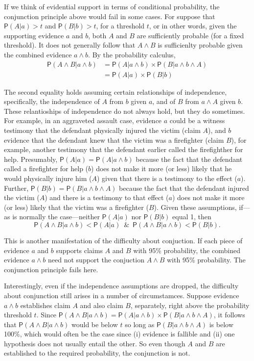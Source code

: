 \documentclass[10pt,dvipsnames,enabledeprecatedfontcommands]{scrartcl}
\newcommand{\et}{\wedge}
\newcommand{\pr}[1]{\mathsf{P}(#1)}
\begin{document}
If we think of evidential support in terms of conditional probability,
the conjunction principle above would fail in some cases. For suppose
that \(\pr{A | a}>t\) and \(\pr{B | b}>t\), for a threshold \(t\), or in
other words, given the supporting evidence \(a\) and \(b\), both \(A\)
and \(B\) are sufficiently probable (for a fixed threshold). It does not
generally follow that \(A \et B\) is sufficienlty probable given the
combined evidence \(a\et b\). By the probability calculus,
\begin{align*}
\pr{A \wedge  B | a \wedge b}& =\pr{A |a \wedge b} \times \pr{B | a \wedge b \wedge A}\\
 & = \pr{A |a} \times \pr{B | b}
 \end{align*}

\noindent The second equality holds assuming certain relationships of
independence, specifically, the independence of \(A\) from \(b\) given
\(a\), and of \(B\) from \(a \wedge A\) given \(b\). These relantioships
of independence do not always hold, but they do sometimes. For example,
in an aggraveted assault case, evidence \(a\) could be a witness
testimony that the defendant physically injured the victim (claim
\(A\)), and \(b\) evidence that the defendant knew that the victim was a
firefighter (claim \(B\)), for example, another testimony that the
defendant earlier called the firefighther for help. Presumably,
\(\pr{A \vert a}=\pr{A \vert a \wedge b}\) because the fact that the
defendant called a firefighter for help (\(b\)) does not make it more
(or less) likely that he would physically injure him (\(A\)) given that
there is a testimony to the effect (\(a\)). Further,
\(\pr{B \vert b}=\pr{B \vert a \wedge b \wedge A}\) because the fact
that the defendant injured the victim (\(A\)) and there is a testimony
to that effect (\(a\)) does not make it more (or less) likely that the
victim was a firefighter (\(B\)). Given these assumptions, if---as is
normally the case---neither \(\pr{A \vert a}\) nor \(\pr{B \vert b}\)
equal 1, then
\[\pr{A \wedge B \vert a \wedge b}< \pr{A \vert a} \;\ \& \;\ \pr{A \wedge B \vert a \wedge b} < \pr{B \vert b}. \]

\noindent This is another manifestation of the difficulty about
conjuction. If each piece of evidence \(a\) and \(b\) supports claims
\(A\) and \(B\) with 95\% probability, the combined evidence \(a\et b\)
need not support the conjuction \(A\et B\) with 95\% probability. The
conjunction principle fails here.

Interestingly, even if the independence assumptions are dropped, the
difficulty about conjunction still arises in a number of circumstamces.
Suppose evidence \(a\et b\) establishes claim \(A\) and also claim
\(B\), separately, right above the probability threshold \(t\). Since
\(\pr{A \wedge B | a \wedge b} =\pr{A |a \wedge b} \times \pr{B | a \wedge b \wedge A}\),
it follows that \(\pr{A \wedge B | a \wedge b}\) would be below \(t\) so
long as \(\pr{B | a \wedge b \wedge A}\) is below 100\%, which would
often be the case since (i) evidence is fallible and (ii) one hypothesis
does not usually entail the other. So even though \(A\) and \(B\) are
established to the required probability, the conjunction is not.
\end{document}
